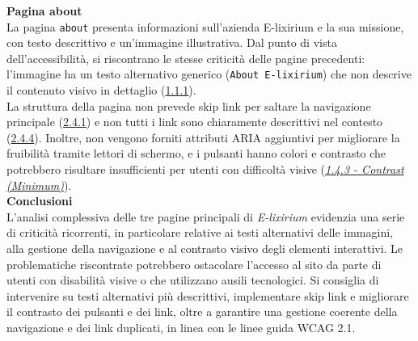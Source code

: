 \noindent \textbf{Pagina about}\\
La pagina \texttt{about} presenta informazioni sull’azienda E-lixirium e la sua missione, con testo descrittivo e un’immagine illustrativa. Dal punto di vista dell’accessibilità, si riscontrano le stesse criticità delle pagine precedenti: l’immagine ha un testo alternativo generico (\texttt{About E-lixirium}) che non descrive il contenuto visivo in dettaglio ({\hyperref[wcag:1.1.1]{1.1.1}}).\\
La struttura della pagina non prevede skip link per saltare la navigazione principale ({\hyperref[wcag:2.4.1]{2.4.1}}) e non tutti i link sono chiaramente descrittivi nel contesto ({\hyperref[wcag:2.4.4]{2.4.4}}). Inoltre, non vengono forniti attributi ARIA aggiuntivi per migliorare la fruibilità tramite lettori di schermo, e i pulsanti hanno colori e contrasto che potrebbero risultare insufficienti per utenti con difficoltà visive ({\hyperref[wcag:1.4.3]{\textit{1.4.3 - Contrast (Minimum)}}}).\\

\noindent \textbf{Conclusioni}\\
L’analisi complessiva delle tre pagine principali di \textit{E-lixirium} evidenzia una serie di criticità ricorrenti, in particolare relative ai testi alternativi delle immagini, alla gestione della navigazione e al contrasto visivo degli elementi interattivi. Le problematiche riscontrate potrebbero ostacolare l’accesso al sito da parte di utenti con disabilità visive o che utilizzano ausili tecnologici. Si consiglia di intervenire su testi alternativi più descrittivi, implementare skip link e migliorare il contrasto dei pulsanti e dei link, oltre a garantire una gestione coerente della navigazione e dei link duplicati, in linea con le linee guida WCAG 2.1.

